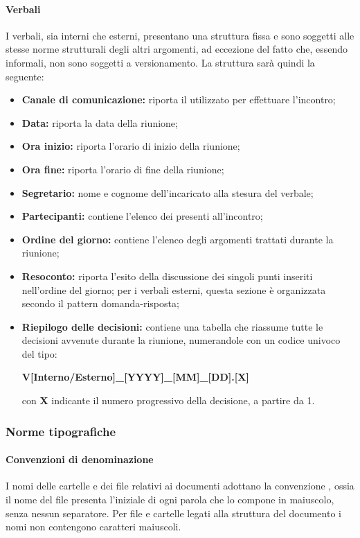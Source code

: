 {\paragraph{Verbali}      
I verbali, sia interni che esterni, presentano una struttura fissa e sono soggetti alle stesse norme strutturali degli altri argomenti, ad eccezione del fatto che, essendo informali, non sono soggetti a versionamento.
La struttura sarà quindi la seguente:
\begin{itemize}
	\item \textbf{Canale di comunicazione:} riporta il  utilizzato per effettuare l'incontro;
	\item \textbf{Data:} riporta la data della riunione;
	\item \textbf{Ora inizio:} riporta l'orario di inizio della riunione;
	\item \textbf{Ora fine:} riporta l'orario di fine della riunione;
	\item \textbf{Segretario:} nome e cognome dell'incaricato alla stesura del verbale;
	\item \textbf{Partecipanti:} contiene l'elenco dei presenti all'incontro;   
	\item \textbf{Ordine del giorno:} contiene l'elenco degli argomenti trattati durante la riunione;
	\item \textbf{Resoconto:} riporta l'esito della discussione dei singoli punti inseriti nell'ordine del giorno; per i verbali esterni, questa sezione è organizzata secondo il pattern domanda-risposta;
	\item \textbf{Riepilogo delle decisioni:} contiene una tabella che riassume tutte le decisioni avvenute durante la riunione, numerandole con un codice univoco del tipo: \newline 
	\centerline{\textbf{V[Interno/Esterno]\_[YYYY]\_[MM]\_[DD].[X]}}\newline con \textbf{X} indicante il numero progressivo della decisione, a partire da 1.
\end{itemize}
\subsubsection{Norme tipografiche}
\paragraph*{Convenzioni di denominazione}   
I nomi delle cartelle e dei file relativi ai documenti adottano la convenzione , ossia il nome del file presenta l'iniziale di ogni parola che lo compone in maiuscolo, senza nessun separatore. Per file e cartelle legati alla struttura del documento i nomi non contengono caratteri maiuscoli. 
}
